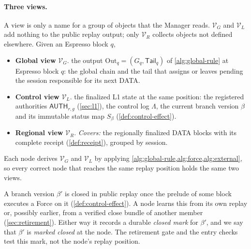 \documentclass[11pt,a4paper]{article}
\newcommand{\tagg}[1]{\ensuremath{\mathsf{#1}}}
\newcommand{\defterm}[1]{\textcolor{rrBlue}{\textit{#1}}}
\begin{document}
\paragraph{Three views.}
A view is only a name for a group of objects that the Manager reads.
$\mathcal V_G$ and $\mathcal V_L$ add nothing to the public replay
output; only $\mathcal V_R$ collects objects not defined elsewhere. Given an Espresso block $q$,
\begin{itemize}
\item \textbf{Global view} $\mathcal V_G$. the output
$\mathrm{Out}_q=(G_q,\mathsf{Tail}_q)$ of \cref{alg:global-rule} at Espresso
block $q$: the global chain and the tail that assigns or leaves pending
the session responsible for its next DATA.
\item \textbf{Control view} $\mathcal V_L$. the finalized
L1 state at the same position: the registered authorities
$\tagg{AUTH}_{r,g}$ (\cref{sec:l1}), the control log $\Lambda$, the
current branch version $\beta$ and its immutable status map $S_\beta$
(\cref{def:control-effect}).
\item \textbf{Regional view} $\mathcal V_R$. \emph{Covers:} the
regionally finalized DATA blocks with its complete
receipt (\cref{def:receipt}), grouped by session. 
\end{itemize}

Each node derives $\mathcal V_G$ and $\mathcal V_L$ by applying
\cref{alg:global-rule,alg:force,alg:external}, so every correct node that
reaches the same replay position holds the same two views.

A branch version $\beta'$ is closed in public replay once the prelude
of some block executes a Force on it (\cref{def:control-effect}). A node
learns this from its own replay or, possibly earlier, from a verified
close bundle of another member (\cref{sec:retirement}). Either way it
records a durable \defterm{closed mark} for $\beta'$, and we say that
$\beta'$ is \defterm{marked closed} at the node. The retirement gate and
the entry checks test this mark, not the node's replay position.
\end{document}
